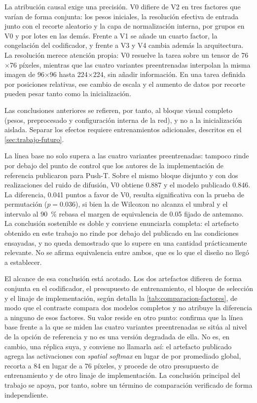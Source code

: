 La atribuci\'on causal exige una precisi\'on. V0 difiere de V2 en tres factores que
var\'ian de forma conjunta: los pesos iniciales, la resoluci\'on efectiva de entrada junto
con el recorte aleatorio y la capa de normalizaci\'on interna, por grupos en V0 y por
lotes en las dem\'as. Frente a V1 se a\~nade un cuarto factor, la congelaci\'on del
codificador, y frente a V3 y V4 cambia adem\'as la arquitectura. La resoluci\'on merece
atenci\'on propia: V0 resuelve la tarea sobre un tensor de \num{76}$\times$\num{76}
p\'ixeles, mientras que las cuatro variantes preentrenadas interpolan la misma imagen de
\num{96}$\times$\num{96} hasta \num{224}$\times$\num{224}, sin a\~nadir informaci\'on. En
una tarea definida por posiciones relativas, ese cambio de escala y el aumento de datos
por recorte pueden pesar tanto como la inicializaci\'on.

Las conclusiones anteriores se refieren, por tanto, al bloque visual completo (pesos,
preprocesado y configuraci\'on interna de la red), y no a la inicializaci\'on aislada.
Separar los efectos requiere entrenamientos adicionales, descritos en el
\cref{sec:trabajo-futuro}.


La l\'inea base no solo supera a las cuatro variantes preentrenadas: tampoco rinde por
debajo del punto de control que los autores de la implementaci\'on de referencia publicaron
para Push-T. Sobre el mismo bloque disjunto y con dos realizaciones del ruido de difusi\'on,
V0 obtiene \num{0.887} y el modelo publicado \num{0.846}. La diferencia, \num{0.041} puntos
a favor de V0, resulta significativa con la prueba de permutaci\'on
($p = \num{0.036}$), si bien la de Wilcoxon no alcanza el umbral y el intervalo al
\SI{90}{\percent} rebasa el margen de equivalencia de \num{0.05} fijado de antemano. La
conclusi\'on sostenible es doble y conviene enunciarla completa: el artefacto obtenido en
este trabajo no rinde por debajo del publicado en las condiciones ensayadas, y no queda
demostrado que lo supere en una cantidad pr\'acticamente relevante. No se afirma
equivalencia entre ambos, que es lo que el dise\~no no lleg\'o a establecer.

El alcance de esa conclusi\'on est\'a acotado. Los dos artefactos difieren de forma conjunta
en el codificador, el presupuesto de entrenamiento, el bloque de selecci\'on y el linaje de
implementaci\'on, seg\'un detalla la \cref{tab:comparacion-factores}, de modo que el
contraste compara dos modelos completos y no atribuye la diferencia a ninguno de esos
factores. Su valor reside en otro punto: confirma que la l\'inea base frente a la que se
miden las cuatro variantes preentrenadas se sit\'ua al nivel de la opci\'on de referencia y
no es una versi\'on degradada de ella. No es, en cambio, una r\'eplica suya, y conviene no
llamarla as\'i: el artefacto publicado agrega las activaciones con \textit{spatial softmax}
en lugar de por promediado global, recorta a \num{84} en lugar de a \num{76} p\'ixeles, y
procede de otro presupuesto de entrenamiento y de otro linaje de implementaci\'on. La
conclusi\'on principal del trabajo se apoya, por tanto, sobre un t\'ermino de comparaci\'on
verificado de forma independiente.

